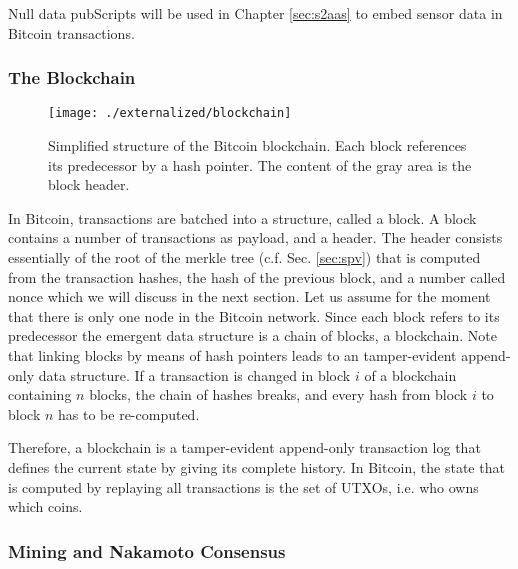 Null data pubScripts will be used in Chapter \ref{sec:s2aas} to embed sensor data in Bitcoin transactions.

\subsubsection{The Blockchain}
\label{sec:blockchain}

 \begin{figure*}[!t]
    \centering
    \texttt{[image: ./externalized/blockchain]}
    \caption{Simplified structure of the Bitcoin blockchain. Each block references its predecessor by a hash pointer. The content of the gray area is the block header.}
    \label{fig:blockchain}
  \end{figure*}

In Bitcoin, transactions are batched into a structure, called a block. A block contains a number of transactions as payload, and a header. The header consists essentially of the root of the merkle tree (c.f. Sec. \ref{sec:spv}) that is computed from the transaction hashes, the hash of the previous block, and a number called nonce which we will discuss in the next section. Let us assume for the moment that there is only one node in the Bitcoin network. Since each block refers to its predecessor the emergent data structure is a chain of blocks, a blockchain. Note that linking blocks by means of hash pointers leads to an tamper-evident append-only data structure. If a transaction is changed in block $i$ of a blockchain containing $n$ blocks, the chain of hashes breaks, and every hash from block $i$ to block $n$ has to be re-computed.

Therefore, a blockchain is a tamper-evident append-only transaction log that defines the current state by giving its complete history. In Bitcoin, the state that is computed by replaying all transactions is the set of \ac{UTXO}s, i.e. who owns which coins.

\subsubsection{Mining and Nakamoto Consensus}
\label{sec:mining}

